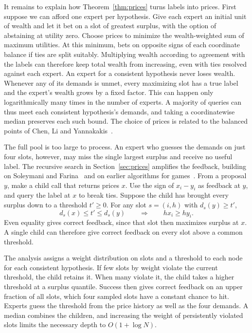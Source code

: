 It remains to explain how Theorem~\ref{thm:prices} turns labels into
prices. First suppose we can afford one expert per hypothesis. Give
each expert an initial unit of wealth and let it bet on a slot of
greatest surplus, with the option of abstaining at utility zero.
Choose prices to minimize the wealth-weighted sum of maximum
utilities. At this minimum, bets on opposite signs of each
coordinate balance if ties are split suitably. Multiplying wealth
according to agreement with the labels can therefore keep total
wealth from increasing, even with ties resolved against each expert.
An expert for a consistent hypothesis never loses wealth. Whenever
any of its demands is unmet, every maximizing slot has a true label
and the expert's wealth grows by a fixed factor. This can happen only
logarithmically many times in the number of experts. A majority of
queries can thus meet each consistent hypothesis's demands, and
taking a coordinatewise median preserves each such bound. The choice
of prices is related to the balanced points of Chen, Li and
Yannakakis~\cite{CLY}.

The full pool is too large to process. An expert who guesses the
demands on just four slots, however, may miss the single largest
surplus and receive no useful label. The recursive search in
Section~\ref{sec:prices} amplifies the feedback, building on
Soleymani and Farina~\cite{SF} and on earlier algorithms for
games~\cite{OAIDe,OAIRa,OAITu}. From a proposal \(y\), make a child
call that returns prices \(x\). Use the sign of \(x_i-y_i\) as
feedback at \(y\), and query the label at \(x\) to break ties.
Suppose the child has brought every surplus down to a threshold
\(t'\ge0\). For any slot \(s=(i,h)\) with \(d_s(y)\ge t'\),
\[
 d_s(x)\le t'\le d_s(y)\qquad\Longrightarrow\qquad h x_i\ge h y_i.
\]
Even equality gives correct feedback, since that slot then maximizes
surplus at \(x\). A single child can therefore give correct feedback
on every slot above a common threshold.

The analysis assigns a weight distribution on slots and a threshold
to each node for each consistent hypothesis. If few slots by weight
violate the current threshold, the child retains it. When many
violate it, the child takes a higher threshold at a surplus quantile.
Success then gives correct feedback on an upper fraction of all
slots, which four sampled slots have a constant chance to hit.
Experts guess the threshold from the price history as well as the
four demands. A median combines the children, and increasing the
weight of persistently violated slots limits the necessary depth to
\(O(1+\log N)\).

